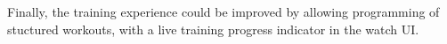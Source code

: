 \documentclass[a4paper, oneside]{discothesis}
\begin{document}
Finally, the training experience could be improved by allowing programming of stuctured workouts, with a live training progress indicator in the watch UI.





\appendix
\end{document}
